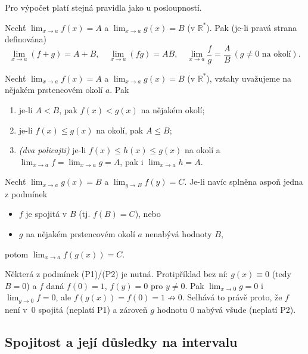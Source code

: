 \documentclass[11pt,a4paper]{article}
\begin{document}
Pro výpočet platí stejná pravidla jako u posloupností.

\begin{veta}
Nechť $\lim_{x\to a}f(x)=A$ a $\lim_{x\to a}g(x)=B$ (v $\mathbb{R}^*$). Pak (je-li pravá strana definována)
\[
  \lim_{x\to a}(f+g)=A+B,\quad \lim_{x\to a}(fg)=AB,\quad \lim_{x\to a}\frac{f}{g}=\frac{A}{B}\ (g\neq0\text{ na okolí}).
\]
\end{veta}

\begin{veta}
Nechť $\lim_{x\to a}f(x)=A$ a $\lim_{x\to a}g(x)=B$ (v $\mathbb{R}^*$), vztahy uvažujeme na nějakém prstencovém okolí $a$. Pak
\begin{enumerate}
  \item je-li $A<B$, pak $f(x)<g(x)$ na nějakém okolí;
  \item je-li $f(x)\le g(x)$ na okolí, pak $A\le B$;
  \item \emph{(dva policajti)} je-li $f(x)\le h(x)\le g(x)$ na okolí a $\lim_{x\to a}f=\lim_{x\to a}g=A$, pak i $\lim_{x\to a}h=A$.
\end{enumerate}
\end{veta}

\begin{veta}
Nechť $\lim_{x\to a}g(x)=B$ a $\lim_{y\to B}f(y)=C$. Je-li navíc splněna aspoň jedna z podmínek
\begin{itemize}
  \item[(P1)] $f$ je spojitá v $B$ (tj. $f(B)=C$), nebo
  \item[(P2)] $g$ na nějakém prstencovém okolí $a$ nenabývá hodnoty $B$,
\end{itemize}
potom $\lim_{x\to a}f(g(x))=C$.
\end{veta}

\begin{poznamka}
Některá z podmínek (P1)/(P2) je nutná. Protipříklad bez ní: $g(x)\equiv0$ (tedy $B=0$) a $f$ daná $f(0)=1$, $f(y)=0$ pro $y\neq0$. Pak $\lim_{x\to0}g=0$ i $\lim_{y\to0}f=0$, ale $f(g(x))=f(0)=1\not\to0$. Selhává to právě proto, že $f$ není v~$0$ spojitá (neplatí P1) a zároveň $g$ hodnotu $0$ nabývá všude (neplatí P2).
\end{poznamka}

\subsection{Spojitost a její důsledky na intervalu}
\end{document}
